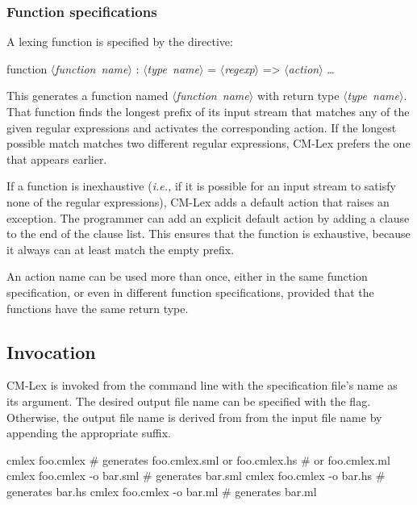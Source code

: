 \documentclass[10pt]{article}
\newcommand{\nonterm}[1]{\mbox{$\langle${\it{}#1}$\rangle$}}
\begin{document}
\subsubsection{Function specifications}

A lexing function is specified by the directive:

\begin{code}
function \nonterm{function name} : \nonterm{type name} =
   \nonterm{regexp} => \nonterm{action}
   \dots
\end{code}

This generates a function named \nonterm{function name} with return type
\nonterm{type name}.  That function finds the longest prefix of its input
stream that matches any of the given regular expressions and activates
the corresponding action.  If the longest possible match matches two
different regular expressions, CM-Lex prefers the one that appears
earlier.

If a function is inexhaustive ({\em i.e.,} if it is possible for an input
stream to satisfy none of the regular expressions), CM-Lex adds a
default action that raises an exception.  The programmer can add an
explicit default action by adding a clause 
to the end of the clause list.  This ensures that the function is
exhaustive, because it always can at least match the empty prefix.

An action name can be used more than once, either in the same function
specification, or even in different function specifications, provided
that the functions have the same return type.


\subsection{Invocation}

CM-Lex is invoked from the command line with the specification file's
name as its argument.  The desired output file name can be specified
with the  flag.  Otherwise, the output file name is derived from from
the input file name by appending the appropriate suffix.

\begin{code}
cmlex foo.cmlex               # generates foo.cmlex.sml or foo.cmlex.hs
                              #   or foo.cmlex.ml
cmlex foo.cmlex -o bar.sml    # generates bar.sml
cmlex foo.cmlex -o bar.hs     # generates bar.hs
cmlex foo.cmlex -o bar.ml     # generates bar.ml
\end{code}
\end{document}
